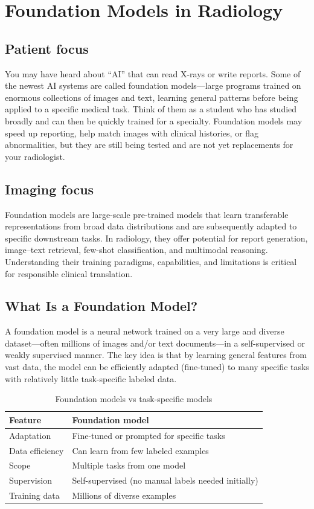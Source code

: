 \chapter{Foundation Models in Radiology}

\section*{Patient focus}
You may have heard about ``AI'' that can read X-rays or write reports. Some of the newest AI systems are called foundation models---large programs trained on enormous collections of images and text, learning general patterns before being applied to a specific medical task. Think of them as a student who has studied broadly and can then be quickly trained for a specialty. Foundation models may speed up reporting, help match images with clinical histories, or flag abnormalities, but they are still being tested and are not yet replacements for your radiologist.

\section*{Imaging focus}
Foundation models are large-scale pre-trained models that learn transferable representations from broad data distributions and are subsequently adapted to specific downstream tasks. In radiology, they offer potential for report generation, image--text retrieval, few-shot classification, and multimodal reasoning. Understanding their training paradigms, capabilities, and limitations is critical for responsible clinical translation.
\label{ch:ch87_foundation_models}

\section{What Is a Foundation Model?}
A foundation model is a neural network trained on a very large and diverse dataset---often millions of images and/or text documents---in a self-supervised or weakly supervised manner. The key idea is that by learning general features from vast data, the model can be efficiently adapted (fine-tuned) to many specific tasks with relatively little task-specific labeled data.

\begin{table}[h]
\centering
\caption{Foundation models vs task-specific models}
\begin{tabular}{|p{5cm}|p{5cm}|}
\hline
\textbf{Feature} & \textbf{Foundation model} \\
\hline
Adaptation & Fine-tuned or prompted for specific tasks \\
\hline
Data efficiency & Can learn from few labeled examples \\
\hline
Scope & Multiple tasks from one model \\
\hline
Supervision & Self-supervised (no manual labels needed initially) \\
\hline
Training data & Millions of diverse examples \\
\hline
\end{tabular}
\end{table}

